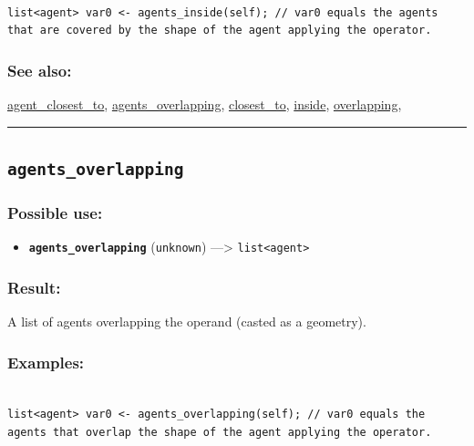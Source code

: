 \documentclass[]{book}
\providecommand{\tightlist}{%
  \setlength{\itemsep}{0pt}\setlength{\parskip}{0pt}}
\theoremstyle{definition}
\theoremstyle{definition}
\theoremstyle{definition}
\theoremstyle{remark}
\begin{document}
\begin{verbatim}
 
list<agent> var0 <- agents_inside(self); // var0 equals the agents that are covered by the shape of the agent applying the operator.
\end{verbatim}

\subsubsection{See also:}\label{see-also-22}

\href{operators-a-to-a.html\#agent_closest_to}{agent\_closest\_to},
\href{operators-a-to-a.html\#agents_overlapping}{agents\_overlapping},
\href{operators-b-to-c.html\#closest_to}{closest\_to},
\href{operators-i-to-m.html\#inside}{inside},
\href{operators-n-to-r.html\#overlapping}{overlapping},

\begin{center}\rule{0.5\linewidth}{\linethickness}\end{center}

\subsection{\texorpdfstring{\texttt{agents\_overlapping}}{agents\_overlapping}}\label{agents_overlapping}

\subsubsection{Possible use:}\label{possible-use-31}

\begin{itemize}
\tightlist
\item
  \textbf{\texttt{agents\_overlapping}} (\texttt{unknown})
  ---\textgreater{} \texttt{list\textless{}agent\textgreater{}}
\end{itemize}

\subsubsection{Result:}\label{result-30}

A list of agents overlapping the operand (casted as a geometry).

\subsubsection{Examples:}\label{examples-24}

\begin{verbatim}
 
list<agent> var0 <- agents_overlapping(self); // var0 equals the agents that overlap the shape of the agent applying the operator.
\end{verbatim}
\end{document}
